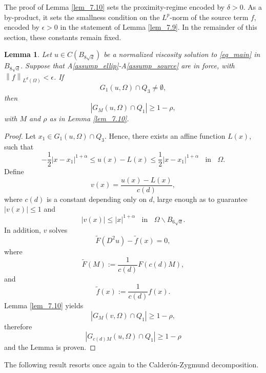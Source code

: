 \documentclass[10pt]{article} %
\newtheorem{Lemma}{Lemma}
\begin{document}
The proof of Lemma \ref{lem_7.10} sets the proximity-regime encoded by $\delta>0$. As a by-product, it sets the smallness condition on the $L^p$-norm of the source term $f$, encoded by $\epsilon>0$ in the statement of Lemma \ref{lem_7.9}. In the remainder of this section, these constants remain fixed.

\begin{Lemma}\label{lem_7.11}
Let $u \in   C (B_{8\sqrt{d}})$ be a normalized viscosity solution to \eqref{eq_main} in $B_{8\sqrt{d}}$. Suppose that A\ref{assump_ellip}-A\ref{assump_source} are in force, { {with $\left\|f\right\|_{L^d(\Omega)}<\epsilon$}}. If
\begin{equation}\label{eq_012}
G_1(u, \Omega)\cap Q_3\not= \emptyset,
\end{equation}
then
\[
|G_M(u, \Omega)\cap Q_1| \geq 1-\rho,
\]
with $M$ and $\rho$ as in Lemma \ref{lem_7.10}.
\end{Lemma}
\begin{proof}
Let $x_1 \in G_1(u,\Omega)\cap Q_3$. Hence, there exists an affine function $L(x)$, such that
\[
-\frac{1}{2}|x-x_1|^{1+\alpha} \leq u(x)-L(x) \leq \frac{1}{2}|x-x_1|^{1+\alpha} \;\; \text{ in }\;\; \Omega.
\]
Define 
\[
v(x) = \frac{u(x)-L(x)}{c(d)},
\]
where $c(d)$ is a constant depending only on $d$, large enough as to guarantee $|v(x)| \leq 1$ and
\[
|v(x)| \leq |x|^{1+\alpha} \;\;\text{ in }\;\;\Omega\backslash B_{6\sqrt{d}}.
\]
In addition, $v$ solves	
\[
	\tilde{F}(D^2u)-\tilde{f}(x) = 0,
\]
where
\[
\tilde{F}(M) := \frac{1}{c(d)}F(c(d)M),
\]
and
\[
\tilde{f}(x) := \frac{1}{c(d)}f(x).
\]
Lemma \ref{lem_7.10} yields
\[
|G_M(v,\Omega)\cap Q_1| \geq 1-\rho,
\]
therefore
\[
	|G_{c(d)M}(u,\Omega)\cap Q_1|\geq 1-\rho
\]
and the Lemma is proven.
\end{proof}

\bigskip

The following result resorts once again to the Calder\'on-Zygmund decomposition.
\end{document}

